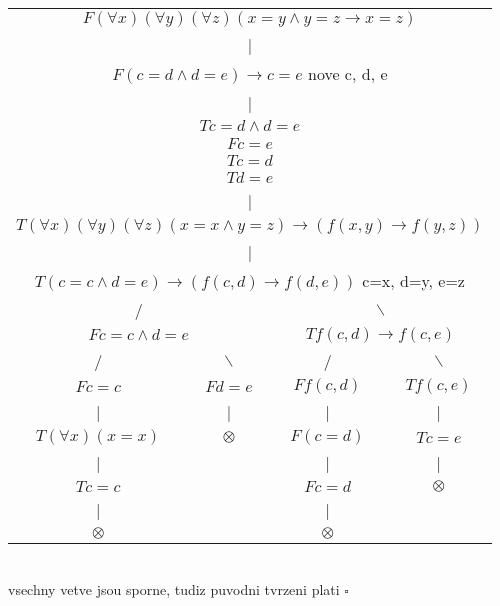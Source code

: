 \documentclass[a4paper]{article}
\begin{document}
\begin{tabular}{ c c c c }
    \multicolumn{4}{c}{$F(\forall x)(\forall y)(\forall z)(x=y \wedge y=z \rightarrow x=z)$} \\
    \multicolumn{4}{c}{|} \\
    \multicolumn{4}{c}{$F(c=d \wedge d=e) \rightarrow c=e$ nove c, d, e} \\
    \multicolumn{4}{c}{|} \\
    \multicolumn{4}{c}{$T c=d \wedge d=e$}\\
    \multicolumn{4}{c}{$F c=e$}\\
    \multicolumn{4}{c}{$T c=d$}\\
    \multicolumn{4}{c}{$T d=e$}\\
    \multicolumn{4}{c}{|} \\
    \multicolumn{4}{c}{$T(\forall x)(\forall y)(\forall z)(x=x \wedge y=z)\rightarrow(f(x,y)\rightarrow f(y,z))$}\\
    \multicolumn{4}{c}{|} \\
    \multicolumn{4}{c}{$T(c=c \wedge d=e) \rightarrow (f(c,d) \rightarrow f(d,e))$ c=x, d=y, e=z}\\ 
    \multicolumn{2}{c}{/} & \multicolumn{2}{c}{$\backslash$} \\
    \multicolumn{2}{c}{$F c=c \wedge d=e$} & \multicolumn{2}{c}{$T f(c,d) \rightarrow f(c,e)$} \\
    / & $\backslash$ & / & $\backslash$ \\
    $F c=c$ & $F d=e$ & $Ff(c,d)$ & $Tf(c,e)$  \\ 
    | & | & | & | \\
    $T(\forall x)(x=x)$ & $\otimes$ &  $F(c=d)$ & $T c=e$ \\  
    | &  & | & | \\
    $T c=c$ &  & $F c=d$ & $\otimes$ \\
    | &  & | &  \\
    $\otimes$ &  & $\otimes$ &     
\end{tabular}
\\
vsechny vetve jsou sporne, tudiz puvodni tvrzeni plati $\square$
\end{document}
